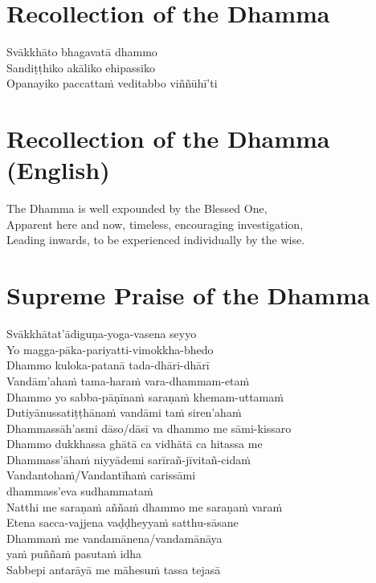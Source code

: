 \section*{Recollection of the Dhamma}

\begin{leader}
\end{leader}

Svākkhāto bhagavatā dhammo\\
Sandiṭṭhiko akāliko ehipassiko\\
Opanayiko paccattaṁ veditabbo viññūhī'ti

\clearpage

\section*{Recollection of the Dhamma (English)}

\begin{leader}
\end{leader}

The Dhamma is well expounded by the Blessed One,\\
Apparent here and now, timeless, encouraging investigation,\\
Leading inwards, to be experienced individually by the wise.

\section*{Supreme Praise of the Dhamma}

\begin{leader}
\end{leader}

Svākkhātat'ādiguṇa-yoga-vasena seyyo\\
Yo magga-pāka-pariyatti-vimokkha-bhedo\\
Dhammo kuloka-patanā tada-dhāri-dhārī\\
Vandām'ahaṁ tama-haraṁ vara-dhammam-etaṁ\\
Dhammo yo sabba-pāṇīnaṁ saraṇaṁ khemam-uttamaṁ\\
Dutiyānussatiṭṭhānaṁ vandāmi taṁ siren'ahaṁ\\
Dhammassāh'asmi dāso/dāsī va dhammo me sāmi-kissaro\\
Dhammo dukkhassa ghātā ca vidhātā ca hitassa me\\
Dhammass'āhaṁ niyyādemi sarīrañ-jīvitañ-cidaṁ\\
Vandantohaṁ/Vandantīhaṁ carissāmi\\
\vin dhammass'eva sudhammataṁ\\
Natthi me saraṇaṁ aññaṁ dhammo me saraṇaṁ varaṁ\\
Etena sacca-vajjena vaḍḍheyyaṁ satthu-sāsane\\
Dhammaṁ me vandamānena/vandamānāya\\
\vin yaṁ puññaṁ pasutaṁ idha\\
Sabbepi antarāyā me māhesuṁ tassa tejasā

